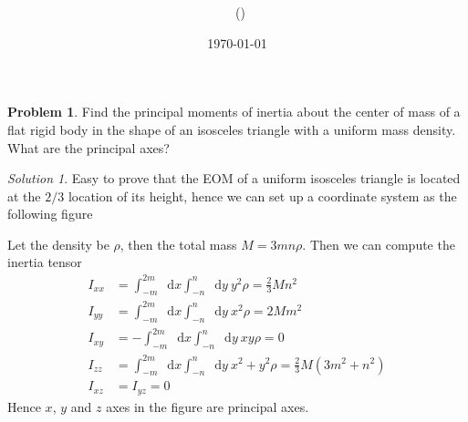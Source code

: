 \documentclass[twoside,11pt]{article}
\title{{\lms \Code \ \Ass}}
\author{\lms \name \ (\href{mailto:\mail}{\mail})}
\date{\sffamily \today}
\makeatletter
\newcommand{\lms}{\fontfamily{lmss}\selectfont} %
\renewcommand*\d{\mathop{}\!\mathrm{d}}
\theoremstyle{definition}
\newtheorem{problem}{\lms Problem}
\theoremstyle{remark}
\newtheorem*{solution}{Solution}
\renewcommand{\maketitle}{\bgroup\setlength{\parindent}{0pt}
\begin{flushleft}
  \textbf{\Large\@title}

  \@author
\end{flushleft}\egroup
}
\makeatother
\begin{document}
\maketitle
\thispagestyle{title}

\begin{problem}
Find the principal moments of inertia about the center of mass of a flat rigid
body in the shape of an isosceles triangle with a uniform mass density.
What are the principal axes?
\end{problem}
\begin{solution}
Easy to prove that the EOM of a uniform isosceles triangle is located at the
$2/3$ location of its height,
hence we can set up a coordinate system as the following figure
\begin{figure}[H]
    \tikzexternalenable
    \centering
    \def\a{1.2}
    \def\b{1}
    \def\c{0.8}
    \tikzexternaldisable
\end{figure}
Let the density be $\rho$, then the total mass $M = 3mn\rho$.
Then we can compute the inertia tensor
\begin{align*}
    I_{xx} &= \int_{-m}^{2m}\d x \int_{-n}^n \d y~ y^2\rho
    = \frac{2}{3}Mn^2\\
    I_{yy} &= \int_{-m}^{2m}\d x \int_{-n}^n \d y~ x^2\rho
    = 2Mm^2\\
    I_{xy} &= -\int_{-m}^{2m}\d x \int_{-n}^n \d y~ xy\rho
    = 0\\
    I_{zz} &= \int_{-m}^{2m}\d x \int_{-n}^n \d y~ x^2+y^2\rho
    = \frac{2}{3}M(3m^2 + n^2)\\
    I_{xz} &= I_{yz} = 0
\end{align*}
Hence $x$, $y$ and $z$ axes in the figure are principal axes.
\end{solution}
\end{document}

